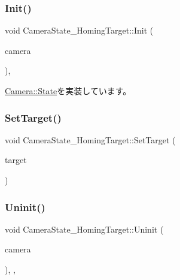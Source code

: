 \subsubsection{\texorpdfstring{Init()}{Init()}}
{\footnotesize\ttfamily void Camera\+State\+\_\+\+Homing\+Target\+::\+Init (\begin{DoxyParamCaption}\item[{\mbox{\hyperlink{class_camera}{Camera}} $\ast$}]{camera }\end{DoxyParamCaption})\hspace{0.3cm}{\ttfamily [override]}, {\ttfamily [virtual]}}



\mbox{\hyperlink{class_camera_1_1_state_aa1b81471ab15e64b3117ffe7de9560ff}{Camera\+::\+State}}を実装しています。

\mbox{\label{class_camera_state___homing_target_af610b65553d715d2991d587665770bb2}} 
\subsubsection{\texorpdfstring{Set\+Target()}{SetTarget()}}
{\footnotesize\ttfamily void Camera\+State\+\_\+\+Homing\+Target\+::\+Set\+Target (\begin{DoxyParamCaption}\item[{\mbox{\hyperlink{class_game_object_origin}{Game\+Object\+Origin}} $\ast$}]{target }\end{DoxyParamCaption})\hspace{0.3cm}{\ttfamily [inline]}}

\mbox{\label{class_camera_state___homing_target_a5b4abde99047da6a20f299990c259ef1}} 
\subsubsection{\texorpdfstring{Uninit()}{Uninit()}}
{\footnotesize\ttfamily void Camera\+State\+\_\+\+Homing\+Target\+::\+Uninit (\begin{DoxyParamCaption}\item[{\mbox{\hyperlink{class_camera}{Camera}} $\ast$}]{camera }\end{DoxyParamCaption})\hspace{0.3cm}{\ttfamily [inline]}, {\ttfamily [override]}, {\ttfamily [virtual]}}



